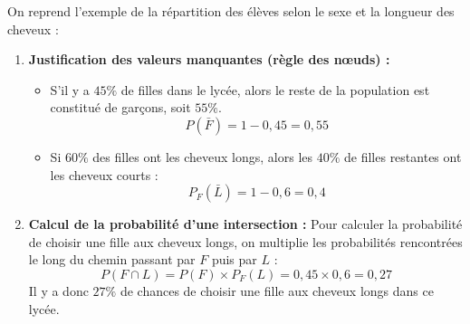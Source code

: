 \begin{ex}
	On reprend l'exemple de la répartition des élèves selon le sexe et la longueur des cheveux :
	\begin{center}
	\end{center}

	\begin{enumerate}
		\item \textbf{Justification des valeurs manquantes (règle des n\oe{}uds) :}
		      \begin{itemize}
			      \item S'il y a $45\%$ de filles dans le lycée, alors le reste de la population est constitué de garçons, soit $55\%$.
			            \[
				            P(\bar{F}) = 1 - 0{,}45 = 0{,}55
			            \]
			      \item Si $60\%$ des filles ont les cheveux longs, alors les $40\%$ de filles restantes ont les cheveux courts :
			            \[
				            P_F(\bar{L}) = 1 - 0{,}6 = 0{,}4
			            \]
		      \end{itemize}

		\item \textbf{Calcul de la probabilité d'une intersection :}
		      Pour calculer la probabilité de choisir une fille aux cheveux longs, on multiplie les probabilités rencontrées le long du chemin passant par $F$ puis par $L$ :
		      \[
			      P(F \cap L) = P(F) \times P_F(L) = 0{,}45 \times 0{,}6 = 0{,}27
		      \]
		      Il y a donc $27\%$ de chances de choisir une fille aux cheveux longs dans ce lycée.
	\end{enumerate}
\end{ex}

